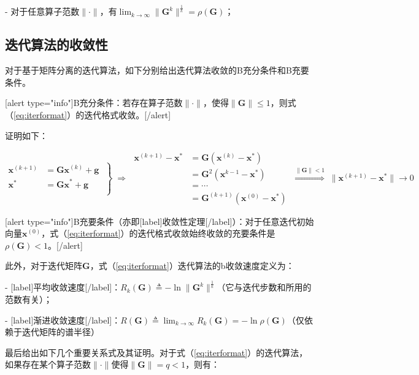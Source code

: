\documentclass[12pt, UTF8, nofonts]{ctexart}
\begin{document}
- 对于任意算子范数$\|\cdot\|$，有$\lim_{k\to\infty}\|\boldsymbol{G}^k\|^{\frac{1}{k}}=\rho(\boldsymbol{G})$；

\subsection*{迭代算法的收敛性}

对于基于矩阵分离的迭代算法，如下分别给出迭代算法收敛的B充分条件和B充要条件。

[alert type="info"]B充分条件：若存在算子范数$\|\cdot\|$，使得$\|\boldsymbol{G}\|\leq1$，则式（\ref{eq:iterformat}）的迭代格式收敛。[/alert]

证明如下：

\[
    \left.\begin{aligned}
        \boldsymbol{x}^{(k+1)} &= \boldsymbol{Gx}^{(k)} + \boldsymbol{g} \\
        \boldsymbol{x}^{\ast} &= \boldsymbol{Gx}^{\ast} + \boldsymbol{g} \\
    \end{aligned} \;\right\} \;\Rightarrow\;
    \begin{aligned}
        \boldsymbol{x}^{(k+1)}-\boldsymbol{x}^{\ast} &=
        \boldsymbol{G}(\boldsymbol{x}^{(k)}-\boldsymbol{x}^{\ast}) \\
        &= \boldsymbol{G}^2(\boldsymbol{x}^{k-1}-\boldsymbol{x}^{\ast}) \\
        &= \cdots \\
        &= \boldsymbol{G}^{(k+1)}(\boldsymbol{x}^{(0)}-\boldsymbol{x}^{\ast})
    \end{aligned} \;\overset{\|\boldsymbol{G}\|<1}{\Longrightarrow}\;
    \|\boldsymbol{x}^{(k+1)}-\boldsymbol{x}^{\ast}\|\to0
\]

[alert type="info"]B充要条件（亦即[label]收敛性定理[/label]）：对于任意迭代初始向量$\boldsymbol{x}^{(0)}$，式（\ref{eq:iterformat}）的迭代格式收敛始终收敛的充要条件是$\rho(\boldsymbol{G})<1$。[/alert]

此外，对于迭代矩阵$\boldsymbol{G}$，式（\ref{eq:iterformat}）迭代算法的b收敛速度定义为：

- [label]平均收敛速度[/label]：$R_k(\boldsymbol{G})\triangleq-\ln\|\boldsymbol{G}^k\|^{\frac{1}{k}}$（它与迭代步数和所用的范数有关）；

- [label]渐进收敛速度[/label]：$R(\boldsymbol{G})\triangleq\lim_{k\to\infty}R_k(\boldsymbol{G})=-\ln\rho(\boldsymbol{G})$（仅依赖于迭代矩阵的谱半径）

最后给出如下几个重要关系式及其证明。对于式（\ref{eq:iterformat}）的迭代算法，如果存在某个算子范数$\|\cdot\|$使得$\|\boldsymbol{G}\|=q<1$，则有：
\end{document}

